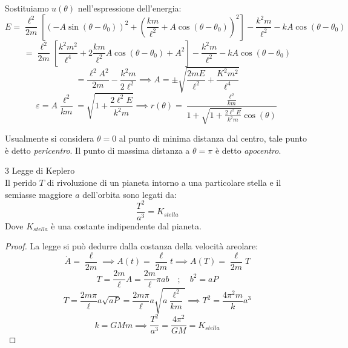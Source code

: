 Sostituiamo $u(\theta)$ nell'espressione dell'energia:
\begin{equation*}
    E = \frac{\ell^2}{2m}\left[ \left( -A\sin(\theta-\theta_0) \right)^2+\left( \frac{km}{\ell^2}+A\cos(\theta-\theta_0) \right)^2 \right]
    -\frac{k^2m}{\ell^2}-kA\cos(\theta-\theta_0)
\end{equation*}
\begin{equation*}
    =\frac{\ell^2}{2m}\left[\frac{k^2m^2}{\ell^4}+2\frac{km}{\ell^2}A\cos(\theta-\theta_0) +A^2\right]
    -\frac{k^2m}{\ell^2}-kA\cos(\theta-\theta_0)
\end{equation*}
\begin{equation}
    =\frac{\ell^2A^2}{2m}-\frac{k^2m}{2\ell^2}\implies A = \pm \sqrt{\frac{2mE}{\ell^2}+\frac{K^2m^2}{\ell^4}}
\end{equation}
\begin{equation}
    \varepsilon= A\frac{\ell^2}{km}= \sqrt{1+\frac{2\ell^2E}{k^2m}}\implies 
    r(\theta)= \frac{\frac{\ell^2}{km}}{1+\sqrt{1+\frac{2\ell^2E}{k^2m}}\cos(\theta)}
\end{equation}

\begin{definition}
    Usualmente si considera $\theta=0$ al punto di minima distanza dal centro, tale punto è detto \textit{pericentro}.
    Il punto di massima distanza a $\theta= \pi$ è detto \textit{apocentro}.
\end{definition}

\begin{theorem}
    3 Legge di Keplero\\
    Il perido $T$ di rivoluzione di un pianeta intorno a una particolare stella e il semiasse maggiore $a$ dell'orbita
    sono legati da:
    \begin{equation}
        \frac{T^2}{a^3}=K_{stella}
    \end{equation}
    Dove $K_{stella}$ è una costante indipendente dal pianeta.
\end{theorem}
\begin{proof}
    La legge si può dedurre dalla costanza della velocità areolare:
    \begin{equation*}
        \dot{A}= \frac{\ell}{2m}\implies A(t)= \frac{\ell}{2m}t \implies    A(T)= \frac{\ell}{2m}T
    \end{equation*}
    \begin{equation*}
        T = \frac{2m}{\ell}A= \frac{2m}{\ell}\pi ab\quad ; \quad b^2 = aP
    \end{equation*}
    \begin{equation*}
        T = \frac{2m\pi}{\ell}a\sqrt{aP}= \frac{2m\pi}{\ell}a\sqrt{a\frac{\ell^2}{km}}
        \implies T^2 = \frac{4\pi^2m}{k}a^3
    \end{equation*}
    \begin{equation*}
        k = GMm \implies \frac{T^2}{a^3}= \frac{4\pi^2}{GM}= K_{stella}
    \end{equation*}
\end{proof}


